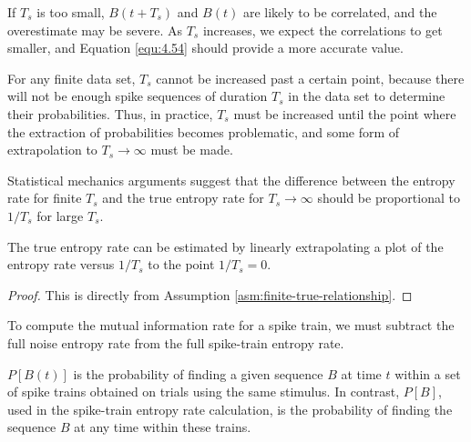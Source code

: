 \begin{rem}
  If $T_{s}$ is too small, $B(t+T_{s})$ and $B(t)$ are likely to be correlated, and the overestimate may be severe. As $T_{s}$ increases, we expect the correlations to get smaller, and Equation \ref{equ:4.54} should provide a more accurate value.
\end{rem}

\begin{rem}
  For any finite data set, $T_{s}$ cannot be increased past a certain point, because there will not be enough spike sequences of duration $T_{s}$ in the data set to determine their probabilities. Thus, in practice, $T_{s}$ must be increased until the point where the extraction of probabilities becomes problematic, and some form of extrapolation to $T_{s}\to\infty$ must be made.
\end{rem}

\begin{asm}
  \label{asm:finite-true-relationship}
  Statistical mechanics arguments suggest that the difference between the entropy rate for finite $T_{s}$ and the true entropy rate for $T_{s}\to\infty$ should be proportional to $1/T_{s}$ for large $T_{s}$.
\end{asm}

\begin{prop}
  The true entropy rate can be estimated by linearly extrapolating a plot of the entropy rate versus $1/T_{s}$ to the point $1/T_{s} = 0$.
\end{prop}
\begin{proof}
  This is directly from Assumption \ref{asm:finite-true-relationship}.
\end{proof}

\begin{rem}
  To compute the mutual information rate for a spike train, we must subtract the full noise entropy rate from the full spike-train entropy rate.
\end{rem}

\begin{ntn}
  $P[B(t)]$ is the probability of finding a given sequence $B$ at time $t$ within a set of spike trains obtained on trials using the same stimulus. In contrast, $P[B]$, used in the spike-train entropy rate calculation, is the probability of finding the sequence $B$ at any time within these trains.
\end{ntn}

